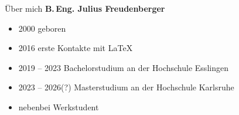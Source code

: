 \begin{frame}{Über mich}
  \textbf{B.\,Eng. Julius Freudenberger}
  \begin{itemize}
    \item 2000 geboren
    \item 2016 erste Kontakte mit \LaTeX
    \item 2019 -- 2023 Bachelorstudium an der Hochschule Esslingen
    \item 2023 -- 2026(?) Masterstudium an der Hochschule Karlsruhe
    \item nebenbei Werkstudent
  \end{itemize}
\end{frame}
